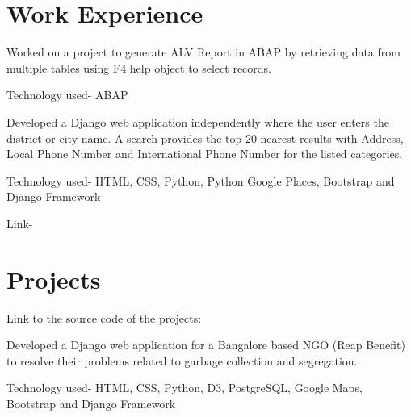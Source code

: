 \documentclass[]{resume-openfont}
\begin{document}
\begin{minipage}[t]{0.66\textwidth} 


\section{Work Experience}

Worked on a project to generate ALV Report in ABAP by retrieving data from multiple tables using F4 help object to select records.
\vspace{\topsep} %
\begin{tightemize}
\item Technology used- ABAP
\end{tightemize}
\sectionsep

Developed a Django web application independently where the user enters the district or city name. A search provides the top 20 nearest results with Address, Local Phone Number and International Phone Number for the listed categories. 
\begin{tightemize}
\item Technology used- HTML, CSS, Python, Python Google Places, Bootstrap and Django Framework
\item Link- \href{https://find-my-perfect-place.herokuapp.com/}{}
\end{tightemize}

\sectionsep


\section{Projects}

Link to the source code of the projects: \href{https://github.com/Diksha-Rathi}{} \sectionsep

Developed a Django web application for a Bangalore based NGO (Reap Benefit) to resolve their problems related to garbage collection and segregation. \\
\begin{tightemize}
\item Technology used- HTML, CSS, Python, D3, PostgreSQL, Google Maps, Bootstrap and Django Framework
\end{tightemize}
\sectionsep


\end{minipage}
\end{document}

